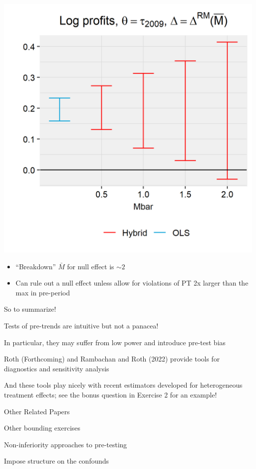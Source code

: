 \documentclass[aspectratio = 169, 13pt]{beamer}
\begin{document}
\begin{frame}
	{\centering
		\includegraphics[width = 0.4\linewidth]{figures/Benzarti-Carloni/sensitivity-MB-profits.png}
	}
	
	\begin{itemize}
		\item
		      ``Breakdown'' $\bar{M}$ for null effect is $\sim 2$
		          
		\item
		      Can rule out a null effect unless allow for violations of PT 2x larger than the max in pre-period
		      
	\end{itemize}
	
\end{frame}


\begin{frame}{So to summarize!}
	\begin{wideitemize}
		\item
		Tests of pre-trends are intuitive but not a panacea!
		    
		\item
		In particular, they may suffer from low power and introduce pre-test bias
		    
		\item
		Roth (Forthcoming) and Rambachan and Roth (2022) provide tools for diagnostics and sensitivity analysis
		    
		\item
		And these tools play nicely with recent estimators developed for heterogeneous treatment effects; see the bonus question in Exercise 2 for an example!
		    
	\end{wideitemize}
\end{frame}

\begin{frame}{Other Related Papers}
	
	\begin{wideitemize}
		
		\item
		Other bounding exercises \citep{manski_how_2017, ye_negative_2021}
		
		\item
		Non-inferiority approaches to pre-testing \citep{bilinski_no_2018, dette_difference--differences_2020}
		
		\item
		Impose structure on the confounds \citep{freyaldenhoven_pre-event_2019}
	\end{wideitemize}
	    
\end{frame}
\end{document}
